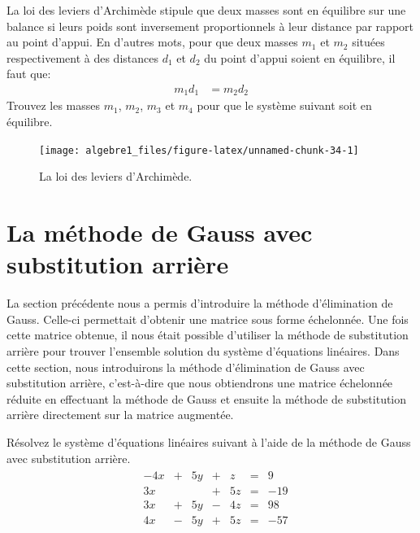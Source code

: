 \documentclass[]{book}
\theoremstyle{definition}
\theoremstyle{definition}
\theoremstyle{definition}
\theoremstyle{remark}
\let\BeginKnitrBlock\begin \let\EndKnitrBlock\end
\begin{document}
\BeginKnitrBlock{example}
\protect\hypertarget{exm:unnamed-chunk-33}{}{\label{exm:unnamed-chunk-33} }La loi des leviers d'Archimède stipule que deux masses sont en équilibre sur une balance si leurs poids sont inversement proportionnels à leur distance par rapport au point d'appui. En d'autres mots, pour que deux masses \(m_1\) et \(m_2\) situées respectivement à des distances \(d_1\) et \(d_2\) du point d'appui soient en équilibre, il faut que:
\begin{align*}
    m_1d_1 &= m_2d_2
\end{align*}
Trouvez les masses \(m_1\), \(m_2\), \(m_3\) et \(m_4\) pour que le système suivant soit en équilibre.
\EndKnitrBlock{example}

\begin{figure}

{\centering \texttt{[image: algebre1\_files/figure-latex/unnamed-chunk-34-1]} 

}

\caption{La loi des leviers d'Archimède.}\label{fig:unnamed-chunk-34}
\end{figure}

\hypertarget{la-muxe9thode-de-gauss-avec-substitution-arriuxe8re}{%
\section{La méthode de Gauss avec substitution arrière}\label{la-muxe9thode-de-gauss-avec-substitution-arriuxe8re}}

La section précédente nous a permis d'introduire la méthode d'élimination de Gauss. Celle-ci permettait d'obtenir une matrice sous forme échelonnée. Une fois cette matrice obtenue, il nous était possible d'utiliser la méthode de substitution arrière pour trouver l'ensemble solution du système d'équations linéaires. Dans cette section, nous introduirons la méthode d'élimination de Gauss avec substitution arrière, c'est-à-dire que nous obtiendrons une matrice échelonnée réduite en effectuant la méthode de Gauss et ensuite la méthode de substitution arrière directement sur la matrice augmentée.

\BeginKnitrBlock{example}
\protect\hypertarget{exm:unnamed-chunk-35}{}{\label{exm:unnamed-chunk-35} }Résolvez le système d'équations linéaires suivant à l'aide de la méthode de Gauss avec substitution arrière.
\begin{align*}
\begin{array}{cccccccc}
&-4x&+&5y&+&z&=&9\\
&3x&&&+&5z&=&-19\\
&3x&+&5y&-&4z&=&98\\
&4x&-&5y&+&5z&=&-57\\
\end{array}
\end{align*}
\EndKnitrBlock{example}
\end{document}
